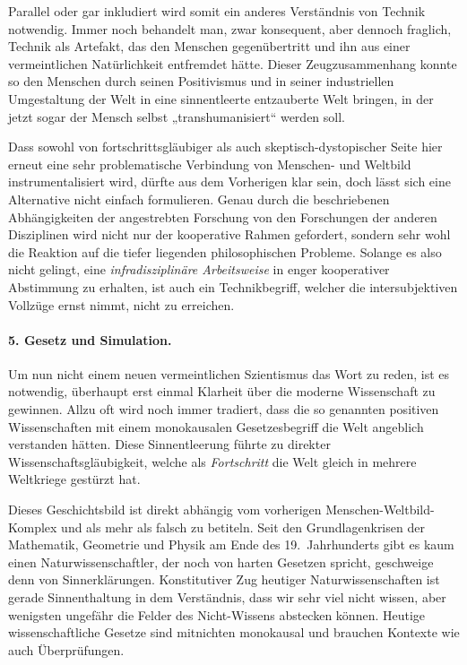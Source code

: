 \documentclass[12pt,a4paper]{article}
\begin{document}
Parallel oder gar inkludiert wird somit ein anderes Verständnis von Technik
notwendig. Immer noch behandelt man, zwar konsequent, aber dennoch fraglich,
Technik als Artefakt, das den Menschen gegenübertritt und ihn aus einer
vermeintlichen Natürlichkeit entfremdet hätte. Dieser Zeugzusammenhang konnte
so den Menschen durch seinen Positivismus und in seiner industriellen
Umgestaltung der Welt in eine sinnentleerte entzauberte Welt bringen, in der
jetzt sogar der Mensch selbst „transhumanisiert“ werden soll.

Dass sowohl von fortschrittsgläubiger als auch skeptisch-dystopischer Seite
hier erneut eine sehr problematische Verbindung von Menschen- und Weltbild
instrumentalisiert wird, dürfte aus dem Vorherigen klar sein, doch lässt sich
eine Alternative nicht einfach formulieren. Genau durch die beschriebenen
Abhängigkeiten der angestrebten Forschung von den Forschungen der anderen
Disziplinen wird nicht nur der kooperative Rahmen gefordert, sondern sehr wohl
die Reaktion auf die tiefer liegenden philosophischen Probleme. Solange es
also nicht gelingt, eine \emph{infradisziplinäre Arbeitsweise} in enger
kooperativer Abstimmung zu erhalten, ist auch ein Technikbegriff, welcher die
intersubjektiven Vollzüge ernst nimmt, nicht zu erreichen.

\paragraph{5. Gesetz und Simulation.}

Um nun nicht einem neuen vermeintlichen Szientismus das Wort zu reden, ist es
notwendig, überhaupt erst einmal Klarheit über die moderne Wissenschaft zu
gewinnen. Allzu oft wird noch immer tradiert, dass die so genannten positiven
Wissenschaften mit einem monokausalen Gesetzesbegriff die Welt angeblich
verstanden hätten.  Diese Sinnentleerung führte zu direkter
Wissenschaftsgläubigkeit, welche als \emph{Fortschritt} die Welt gleich in
mehrere Weltkriege gestürzt hat.

Dieses Geschichtsbild ist direkt abhängig vom vorherigen
Menschen-Weltbild-Komplex und als mehr als falsch zu betiteln.  Seit den
Grundlagenkrisen der Mathematik, Geometrie und Physik am Ende des
19.~Jahrhunderts gibt es kaum einen Naturwissenschaftler, der noch von harten
Gesetzen spricht, geschweige denn von Sinnerklärungen. Konstitutiver Zug
heutiger Naturwissenschaften ist gerade Sinnenthaltung in dem Verständnis,
dass wir sehr viel nicht wissen, aber wenigsten ungefähr die Felder des
Nicht-Wissens abstecken können. Heutige wissenschaftliche Gesetze sind
mitnichten monokausal und brauchen Kontexte wie auch Überprüfungen.
\end{document}
